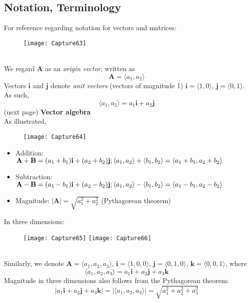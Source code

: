 \documentclass{report}
\begin{document}
\subsection{Notation, Terminology}
For reference regarding notation for vectors and matrices:
\begin{figure}[h]
\texttt{[image: Capture63]}\\
\centering
\end{figure}\\
We regard $\mathbf{A}$ as an \textit{origin vector}, written as
\begin{equation*}
\mathbf{A}=\langle a_1,a_2\rangle
\end{equation*}
Vectors $\mathbf{i}$ and $\mathbf{j}$ denote \textit{unit vectors} (vectors of magnitude 1) $\mathbf{i}=
\langle 1,0\rangle$, $\mathbf{j}=\langle 0,1\rangle$.
As such,
\begin{equation*}
\langle a_1,a_2\rangle=a_1\mathbf{i}+a_2\mathbf{j}
\end{equation*}
(next page)
\newpage
\noindent\textbf{Vector algebra}\\
As illustrated,
\begin{figure}[h]
\texttt{[image: Capture64]}\\
\centering
\end{figure}
\begin{itemize}
\item Addition: $\mathbf{A+B}=(a_1+b_1)\mathbf{i}+(a_2+b_2)\mathbf{j};\\
\langle a_1,a_2\rangle+\langle b_1,b_2\rangle=
\langle a_1+b_1,a_2+b_2\rangle$
\item Subtraction: $\mathbf{A-B}=(a_1-b_1)\mathbf{i}+(a_2-b_2)\mathbf{j};\\
\langle a_1,a_2\rangle-\langle b_1,b_2\rangle=
\langle a_1-b_1,a_2-b_2\rangle$
\item Magnitude: $\mathbf{|A|}=\sqrt{a_1^2+a_2^2}$ (Pythagorean theorem)
\end{itemize}
In three dimensions:
\begin{figure}[h]
\texttt{[image: Capture65]}
\texttt{[image: Capture66]}\\
\centering
\end{figure}\\
Similarly, we denote $\mathbf{A}=\langle a_1,a_2,a_3\rangle$, 
$\mathbf{i}=\langle 1,0,0\rangle$, $\mathbf{j}=\langle 0,1,0\rangle$, 
$\mathbf{k}=\langle 0,0,1\rangle$, where
\begin{equation*}
\langle a_1,a_2,a_3\rangle=a_1\mathbf{i}+a_2\mathbf{j}+a_3\mathbf{k}
\end{equation*}
Magnitude in three dimensions also follows from the Pythagorean theorem:
\begin{equation*}
|a_1\mathbf{i}+a_2\mathbf{j}+a_3\mathbf{k}|=|\langle a_1,a_2,a_3\rangle|
=\sqrt{a_1^2+a_2^2+a_3^2}
\end{equation*}
\newpage
\end{document}
